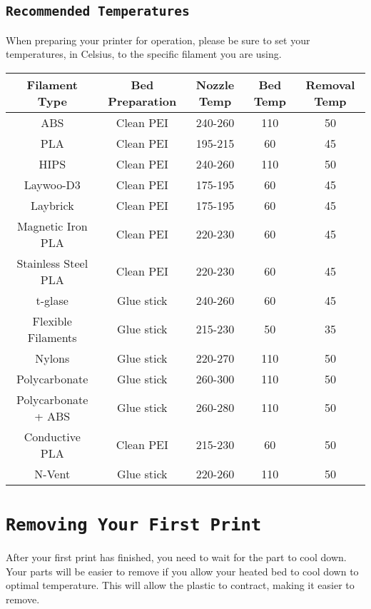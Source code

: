 \subsection{\texttt{Recommended Temperatures}}
When preparing your printer for operation, please be sure to set your temperatures, in Celsius, to the specific filament you are using.

\begin{center}
 \hspace*{-1.5cm}\begin{tabular}{||c c c c c||} 
 \hline
 Filament Type & Bed Preparation & Nozzle Temp & Bed Temp & Removal Temp \\ [0.5ex] 
 \hline\hline
 ABS & Clean PEI & 240-260 & 110 & 50 \\ 
 \hline
 PLA & Clean PEI & 195-215 & 60 & 45 \\
 \hline
 HIPS & Clean PEI & 240-260 & 110 & 50\\
 \hline
 Laywoo-D3 & Clean PEI & 175-195 & 60 & 45 \\
 \hline
 Laybrick & Clean PEI & 175-195 & 60 & 45 \\
 \hline 
 Magnetic Iron PLA & Clean PEI & 220-230 & 60 & 45 \\
 \hline
 Stainless Steel PLA & Clean PEI & 220-230 & 60 & 45 \\
 \hline
 t-glase & Glue stick & 240-260 & 60 & 45 \\
 \hline
 Flexible Filaments & Glue stick & 215-230 & 50 & 35 \\  
 \hline
 Nylons & Glue stick & 220-270 & 110 & 50 \\
 \hline
 Polycarbonate & Glue stick & 260-300 & 110 & 50 \\ 
 \hline
 Polycarbonate + ABS & Glue stick & 260-280 & 110 & 50 \\
 \hline 
 Conductive PLA & Clean PEI & 215-230 & 60 & 50 \\
 \hline
 N-Vent & Glue stick & 220-260 & 110 & 50 \\ [1ex]
 \hline
 
\end{tabular}
\end{center}



\section{\texttt{Removing Your First Print}}
After your first print has finished, you need to wait for the part to cool down.  Your parts will be easier to remove if you allow your heated bed to cool down to optimal temperature. This will allow the plastic to contract, making it easier to remove. 

